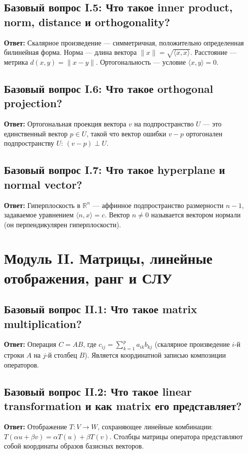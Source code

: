 \subsection{Базовый вопрос I.5: Что такое inner product, norm, distance и orthogonality?}
\textbf{Ответ:} Скалярное произведение — симметричная, положительно определенная билинейная форма.
Норма — длина вектора $\|x\| = \sqrt{\langle x, x \rangle}$.
Расстояние — метрика $d(x, y) = \|x - y\|$.
Ортогональность — условие $\langle x, y \rangle = 0$.

\subsection{Базовый вопрос I.6: Что такое orthogonal projection?}
\textbf{Ответ:} Ортогональная проекция вектора $v$ на подпространство $U$ — это единственный вектор $p \in U$, такой что
вектор ошибки $v - p$ ортогонален подпространству $U$: $(v - p) \perp U$.

\subsection{Базовый вопрос I.7: Что такое hyperplane и normal vector?}
\textbf{Ответ:} Гиперплоскость в $\mathbb{R}^n$ — аффинное подпространство размерности $n - 1$, задаваемое уравнением
$\langle n, x \rangle = c$.
Вектор $n \ne 0$ называется вектором нормали (он перпендикулярен гиперплоскости).

\newpage

\section{Модуль II. Матрицы, линейные отображения, ранг и СЛУ}

\subsection{Базовый вопрос II.1: Что такое matrix multiplication?}
\textbf{Ответ:} Операция $C = AB$, где $c_{ij} = \sum_{k=1}^p a_{ik} b_{kj}$ (скалярное произведение $i$-й строки $A$ на
$j$-й столбец $B$).
Является координатной записью композиции операторов.

\subsection{Базовый вопрос II.2: Что такое linear transformation и как matrix его представляет?}
\textbf{Ответ:} Отображение $T \colon V \to W$, сохраняющее линейные комбинации: $T(\alpha u + \beta v) = \alpha T(u) +
\beta T(v)$.
Столбцы матрицы оператора представляют собой координаты образов базисных векторов.

